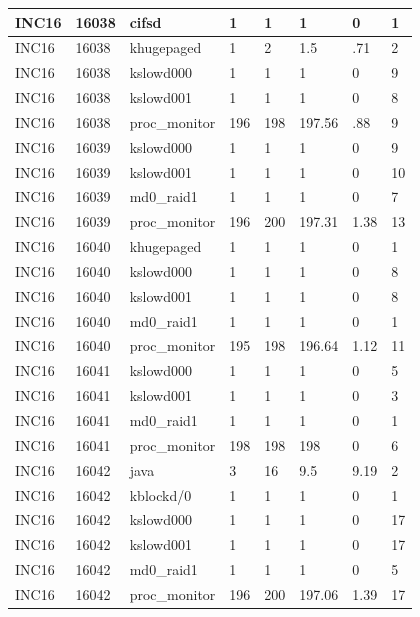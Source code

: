 \begin{table}[h]
\begin{center}
{\begin{tabular}{l|l|l|l|l|l|l|l}
INC16     & 16038     & cifsd     & 1     & 1     & 1     & 0     & 1\\ \hline
INC16     & 16038     & khugepaged     & 1     & 2     & 1.5     & .71     & 2\\ \hline
INC16     & 16038     & kslowd000     & 1     & 1     & 1     & 0     & 9\\ \hline
INC16     & 16038     & kslowd001     & 1     & 1     & 1     & 0     & 8\\ \hline
INC16     & 16038     & proc\_monitor     & 196     & 198     & 197.56     & .88     & 9\\ \hline \hline

INC16     & 16039     & kslowd000     & 1     & 1     & 1     & 0     & 9\\ \hline
INC16     & 16039     & kslowd001     & 1     & 1     & 1     & 0     & 10\\ \hline
INC16     & 16039     & md0\_raid1     & 1     & 1     & 1     & 0     & 7\\ \hline
INC16     & 16039     & proc\_monitor     & 196     & 200     & 197.31     & 1.38     & 13\\ \hline \hline

INC16     & 16040     & khugepaged     & 1     & 1     & 1     & 0     & 1\\ \hline
INC16     & 16040     & kslowd000     & 1     & 1     & 1     & 0     & 8\\ \hline
INC16     & 16040     & kslowd001     & 1     & 1     & 1     & 0     & 8\\ \hline
INC16     & 16040     & md0\_raid1     & 1     & 1     & 1     & 0     & 1\\ \hline
INC16     & 16040     & proc\_monitor     & 195     & 198     & 196.64     & 1.12     & 11\\ \hline \hline

INC16     & 16041     & kslowd000     & 1     & 1     & 1     & 0     & 5\\ \hline
INC16     & 16041     & kslowd001     & 1     & 1     & 1     & 0     & 3\\ \hline
INC16     & 16041     & md0\_raid1     & 1     & 1     & 1     & 0     & 1\\ \hline
INC16     & 16041     & proc\_monitor     & 198     & 198     & 198     & 0     & 6\\ \hline \hline

INC16     & 16042     & java     & 3     & 16     & 9.5     & 9.19     & 2\\ \hline
INC16     & 16042     & kblockd/0     & 1     & 1     & 1     & 0     & 1\\ \hline
INC16     & 16042     & kslowd000     & 1     & 1     & 1     & 0     & 17\\ \hline
INC16     & 16042     & kslowd001     & 1     & 1     & 1     & 0     & 17\\ \hline
INC16     & 16042     & md0\_raid1     & 1     & 1     & 1     & 0     & 5\\ \hline
INC16     & 16042     & proc\_monitor     & 196     & 200     & 197.06     & 1.39     & 17\\ \hline \hline


\end{tabular}}
\end{center}
\end{table}
